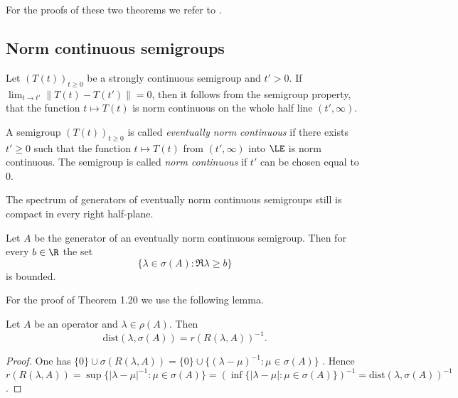 For the proofs of these two theorems we refer to \citet[Chap.3, Theorem 4.7 and 4.8]{pazy:1983}.

\subsection{Norm continuous semigroups} \label{subsec:a2-1.se6}

Let $(T(t))_{t\geq 0}$ be a strongly continuous semigroup and $t' > 0$.
If $\lim_{t \to t'} \|T(t) - T(t')\| = 0$, then it follows from the semigroup property, that the function $t \mapsto T(t)$ is norm continuous on the whole half line $(t',\infty)$.

\begin{definition}\label{def:a2-1.19}
A semigroup $(T(t))_{t\geq 0}$ is called \emph{eventually norm continuous} if there exists $t' \geq 0$ such that the function $t \mapsto T(t)$ from $(t',\infty)$ into $\LE$ is norm continuous.
The semigroup is called \emph{norm continuous} if $t'$ can be chosen equal to $0$.
\end{definition}

The spectrum of generators of eventually norm continuous semigroups still is compact in every right half-plane.

\begin{theorem}\label{thm:a2-1.20}
Let $A$ be the generator of an eventually norm continuous semigroup.
Then for every $b \in \R$ the set
\[
    \{\lambda \in \sigma(A) \colon \Re\lambda \geq b\}
\]
is bounded.
\end{theorem}
For the proof of Theorem 1.20 we use the following lemma.

\begin{lemma}\label{lem:a2-1.21}
Let $A$ be an operator and $\lambda \in \rho(A)$.
Then
\[
    \text{dist}(\lambda,\sigma(A)) = r(R(\lambda,A))^{-1}.
\]
\end{lemma}

\begin{proof}
One has $\{0\} \cup \sigma(R(\lambda,A)) = \{0\} \cup \{(\lambda-\mu)^{-1} \colon \mu \in \sigma(A)\}$ \citet[Lemma 2.11]{davies:1980}.
Hence $r(R(\lambda,A)) = \sup \{|\lambda-\mu|^{-1} \colon \mu \in \sigma(A)\} = 
(\inf \{|\lambda-\mu| \colon \mu \in \sigma(A)\})^{-1} = \text{dist}(\lambda,\sigma(A))^{-1}$.
\end{proof}

